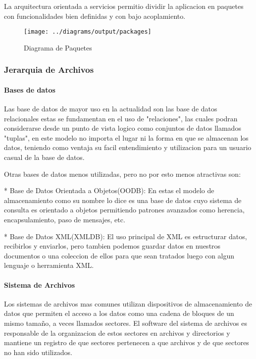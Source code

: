 La arquitectura orientada a servicios permitio dividir la aplicacion en paquetes con funcionalidades bien definidas y con bajo acoplamiento.

\begin{landscape}
\begin{figure}
 \centering
 \texttt{[image: ../diagrams/output/packages]}
 \caption{Diagrama de Paquetes}
 \label{diagrama:paquetes}
\end{figure}
\end{landscape}


\subsubsection{Jerarquia de Archivos}

\paragraph{Bases de datos}

Las base de datos de mayor uso en la actualidad son las base de datos relacionales estas se fundamentan en el uso de "relaciones", las cuales podran considerarse desde un punto de vista logico como conjuntos de datos llamados "tuplas", en este modelo no importa el lugar ni la forma en que se almacenan los datos, teniendo como ventaja su facil entendimiento y utilizacion para un usuario casual de la base de datos.

Otras bases de datos menos utilizadas, pero no por esto menos atractivas son:

* Base de Datos Orientada a Objetos(OODB): En estas el modelo de almacenamiento como su nombre lo dice es una base de datos cuyo sistema de consulta es orientado a objetos permitiendo patrones avanzados como herencia, encapsulamiento, paso de mensajes, etc.

* Base de Datos XML(XMLDB): El uso principal de XML es estructurar datos, recibirlos y enviarlos, pero tambien podemos guardar datos en nuestros documentos o una coleccion de ellos para que sean tratados luego con algun lenguaje o herramienta XML.

\paragraph{Sistema de Archivos}


Los sistemas de archivos mas comunes utilizan dispositivos de almacenamiento de datos que permiten el acceso a los datos como una cadena de bloques de un mismo tamaño, a veces llamados sectores. El software del sistema de archivos es responsable de la organizacion de estos sectores en archivos y directorios y mantiene un registro de que sectores pertenecen a que archivos y de que sectores no han sido utilizados.

